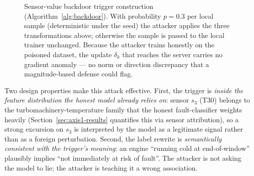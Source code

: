 \documentclass[a4paper,fleqn,doubleblind]{cas-sc}
\begin{document}
\begin{figure}[pos=htbp]
\centering
{}
\caption{Sensor-value backdoor trigger construction (Algorithm~\ref{alg:backdoor}). With probability $p = 0.3$ per local sample (deterministic under the seed) the attacker applies the three transformations above; otherwise the sample is passed to the local trainer unchanged. Because the attacker trains honestly on the poisoned dataset, the update $\delta_k$ that reaches the server carries no gradient anomaly --- no norm or direction discrepancy that a magnitude-based defense could flag.}
\label{fig:backdoor}
\end{figure}

Two design properties make this attack effective. First, the
trigger is \emph{inside the feature distribution the honest model
already relies on}: sensor $s_3$ (T30) belongs to the
turbomachinery-temperature family that the honest fault-classifier
weights heavily (Section~\ref{sec:axis1-results} quantifies this
via sensor attribution), so a strong excursion on $s_3$ is
interpreted by the model as a legitimate signal rather than as a
foreign perturbation. Second, the label rewrite is
\emph{semantically consistent with the trigger's meaning}: an
engine ``running cold at end-of-window'' plausibly implies ``not
immediately at risk of fault''. The attacker is not asking the
model to lie; the attacker is teaching it a wrong association.
\end{document}
